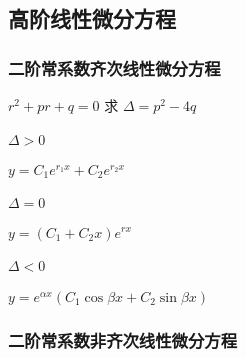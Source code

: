 ﻿\documentclass[a4paper,12pt,UTF8]{ctexart}
\begin{document}
    \subsection{高阶线性微分方程}
    
    \subsubsection{二阶常系数齐次线性微分方程}
    \(r^2+pr+q=0\) 求 \(\Delta=p^2-4q\)
    \paragraph{\(\Delta>0\)} \(y=C_1e^{r_1x}+C_2e^{r_2x}\)
    \paragraph{\(\Delta=0\)} \(y=(C_1+C_2x)e^{rx}\)
    \paragraph{\(\Delta<0\)} \(y=e^{\alpha x}(C_1\cos\beta x+C_2\sin\beta x)\)
    
    \subsubsection{二阶常系数非齐次线性微分方程}
\end{document}
